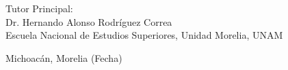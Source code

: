 \begin{titlepage}
\begin{center}
\begin{center}
			\bigskip
			
			Tutor Principal: \\
			Dr. Hernando Alonso Rodríguez Correa\\ Escuela Nacional de Estudios Superiores, Unidad Morelia, UNAM\\
                \bigskip
		\end{center}
		
		\vfill
		
		\begin{center}
			{Michoacán, Morelia (Fecha)}\\
		\end{center}
		\cleardoublepage
	\end{center}
\end{titlepage}

\newpage
\mbox{}
\thispagestyle{empty} 